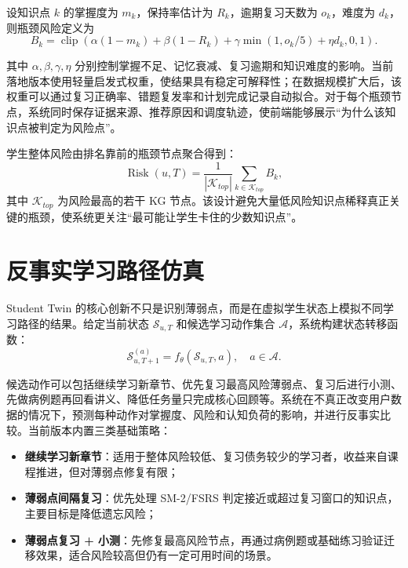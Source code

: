设知识点 $k$ 的掌握度为 $m_k$，保持率估计为 $R_k$，逾期复习天数为 $o_k$，难度为 $d_k$，则瓶颈风险定义为
\begin{equation}
  B_k=\operatorname{clip}
  \left(
  \alpha(1-m_k)+\beta(1-R_k)+\gamma \min(1,o_k/5)+\eta d_k,
  0,1
  \right).
  \label{eq:student-twin-bottleneck-risk}
\end{equation}

其中 $\alpha,\beta,\gamma,\eta$ 分别控制掌握不足、记忆衰减、复习逾期和知识难度的影响。当前落地版本使用轻量启发式权重，使结果具有稳定可解释性；在数据规模扩大后，该权重可以通过复习正确率、错题复发率和计划完成记录自动拟合。对于每个瓶颈节点，系统同时保存证据来源、推荐原因和调度轨迹，使前端能够展示“为什么该知识点被判定为风险点”。

学生整体风险由排名靠前的瓶颈节点聚合得到：
\begin{equation}
  \operatorname{Risk}(u,T)=
  \frac{1}{|\mathcal{K}_{top}|}
  \sum_{k\in \mathcal{K}_{top}}B_k,
  \label{eq:student-twin-overall-risk}
\end{equation}
其中 $\mathcal{K}_{top}$ 为风险最高的若干 KG 节点。该设计避免大量低风险知识点稀释真正关键的瓶颈，使系统更关注“最可能让学生卡住的少数知识点”。

\section{反事实学习路径仿真}

Student Twin 的核心创新不只是识别薄弱点，而是在虚拟学生状态上模拟不同学习路径的结果。给定当前状态 $\mathcal{S}_{u,T}$ 和候选学习动作集合 $\mathcal{A}$，系统构建状态转移函数：
\begin{equation}
  \mathcal{S}_{u,T+1}^{(a)}=
  f_{\theta}(\mathcal{S}_{u,T},a),
  \quad a\in\mathcal{A}.
  \label{eq:student-twin-transition}
\end{equation}

候选动作可以包括继续学习新章节、优先复习最高风险薄弱点、复习后进行小测、先做病例题再回看讲义、降低任务量只完成核心回顾等。系统在不真正改变用户数据的情况下，预测每种动作对掌握度、风险和认知负荷的影响，并进行反事实比较。当前版本内置三类基础策略：

\begin{itemize}
  \item \textbf{继续学习新章节}：适用于整体风险较低、复习债务较少的学习者，收益来自课程推进，但对薄弱点修复有限；
  \item \textbf{薄弱点间隔复习}：优先处理 SM-2/FSRS 判定接近或超过复习窗口的知识点，主要目标是降低遗忘风险；
  \item \textbf{薄弱点复习 + 小测}：先修复最高风险节点，再通过病例题或基础练习验证迁移效果，适合风险较高但仍有一定可用时间的场景。
\end{itemize}

